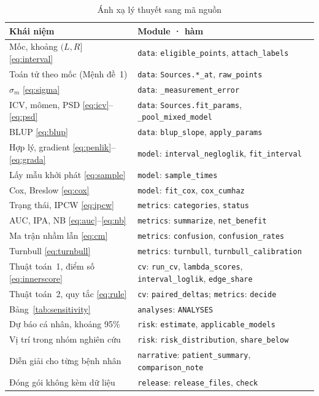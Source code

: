 \documentclass[journal]{IEEEtran}
\newcommand{\code}[1]{\texttt{#1}}
\begin{document}
\begin{table}[t]
\caption{Ánh xạ lý thuyết sang mã nguồn}\label{tab:mapping}
\centering\footnotesize
\begin{tabular}{@{}L{0.40\columnwidth}L{0.55\columnwidth}@{}}
\toprule
Khái niệm & Module · hàm\\
\midrule
Mốc, khoảng $(L,R]$ \eqref{eq:interval} & \code{data}: \code{eligible\_points}, \code{attach\_labels}\\
Toán tử theo mốc (Mệnh đề~1) & \code{data}: \code{Sources.*\_at}, \code{raw\_points}\\
$\hat\sigma_m$ \eqref{eq:sigma} & \code{data}: \code{\_measurement\_error}\\
ICV, mômen, PSD \eqref{eq:icv}--\eqref{eq:psd} & \code{data}: \code{Sources.fit\_params}, \code{\_pool\_mixed\_model}\\
BLUP \eqref{eq:blup} & \code{data}: \code{blup\_slope}, \code{apply\_params}\\
Hợp lý, gradient \eqref{eq:penlik}--\eqref{eq:grada} & \code{model}: \code{interval\_negloglik}, \code{fit\_interval}\\
Lấy mẫu khởi phát \eqref{eq:sample} & \code{model}: \code{sample\_times}\\
Cox, Breslow \eqref{eq:cox} & \code{model}: \code{fit\_cox}, \code{cox\_cumhaz}\\
Trạng thái, IPCW \eqref{eq:ipcw} & \code{metrics}: \code{categories}, \code{status}\\
AUC, IPA, NB \eqref{eq:auc}--\eqref{eq:nb} & \code{metrics}: \code{summarize}, \code{net\_benefit}\\
Ma trận nhầm lẫn \eqref{eq:cm} & \code{metrics}: \code{confusion}, \code{confusion\_rates}\\
Turnbull \eqref{eq:turnbull} & \code{metrics}: \code{turnbull}, \code{turnbull\_calibration}\\
Thuật toán~1, điểm số \eqref{eq:innerscore} & \code{cv}: \code{run\_cv}, \code{lambda\_scores}, \code{interval\_loglik}, \code{edge\_share}\\
Thuật toán~2, quy tắc \eqref{eq:rule} & \code{cv}: \code{paired\_deltas}; \code{metrics}: \code{decide}\\
Bảng~\ref{tab:sensitivity} & \code{analyses}: \code{ANALYSES}\\
Dự báo cá nhân, khoảng 95\% & \code{risk}: \code{estimate}, \code{applicable\_models}\\
Vị trí trong nhóm nghiên cứu & \code{risk}: \code{risk\_distribution}, \code{share\_below}\\
Diễn giải cho từng bệnh nhân & \code{narrative}: \code{patient\_summary}, \code{comparison\_note}\\
Đóng gói không kèm dữ liệu & \code{release}: \code{release\_files}, \code{check}\\
\bottomrule
\end{tabular}
\end{table}
\end{document}
